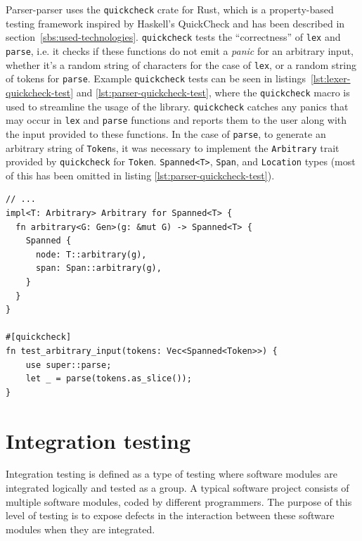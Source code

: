 \documentclass[english,engineering]{wizthesis}
\newcommand{\thisproject}{Parser-parser}
\begin{document}
\thisproject{} uses the \texttt{quickcheck} crate for Rust, which is a
property-based testing framework inspired by Haskell's QuickCheck and has been
described in section~\ref{sbs:used-technologies}. \texttt{quickcheck} tests the
``correctness'' of \texttt{lex} and \texttt{parse}, i.e. it checks if these
functions do not emit a \emph{panic} for an arbitrary input, whether it's a
random string of characters for the case of \texttt{lex}, or a random string of
tokens for \texttt{parse}. Example \texttt{quickcheck} tests can be seen in
listings~\ref{lst:lexer-quickcheck-test} and \ref{lst:parser-quickcheck-test},
where the \texttt{quickcheck} macro is used to streamline the usage of the
library. \texttt{quickcheck} catches any panics that may occur in \texttt{lex}
and \texttt{parse} functions and reports them to the user along with the input
provided to these functions. In the case of \texttt{parse}, to generate an
arbitrary string of \texttt{Token}s, it was necessary to implement the
\texttt{Arbitrary} trait provided by \texttt{quickcheck} for \texttt{Token}.
\texttt{Spanned<T>}, \texttt{Span}, and \texttt{Location} types (most of this
has been omitted in listing \ref{lst:parser-quickcheck-test}).

\begin{listing}[H]
  \begin{verbatim}
// ...
impl<T: Arbitrary> Arbitrary for Spanned<T> {
  fn arbitrary<G: Gen>(g: &mut G) -> Spanned<T> {
    Spanned {
      node: T::arbitrary(g),
      span: Span::arbitrary(g),
    }
  }
}

#[quickcheck]
fn test_arbitrary_input(tokens: Vec<Spanned<Token>>) {
    use super::parse;
    let _ = parse(tokens.as_slice());
}
  \end{verbatim}
  \caption{A QuickCheck test related to the parser, testing strings of arbitraty
  tokens.}
  \label{lst:parser-quickcheck-test}
\end{listing}

\section{Integration testing}

Integration testing is defined as a type of testing where software modules are
integrated logically and tested as a group. A typical software project consists
of multiple software modules, coded by different programmers. The purpose of
this level of testing is to expose defects in the interaction between these
software modules when they are integrated.
\end{document}
